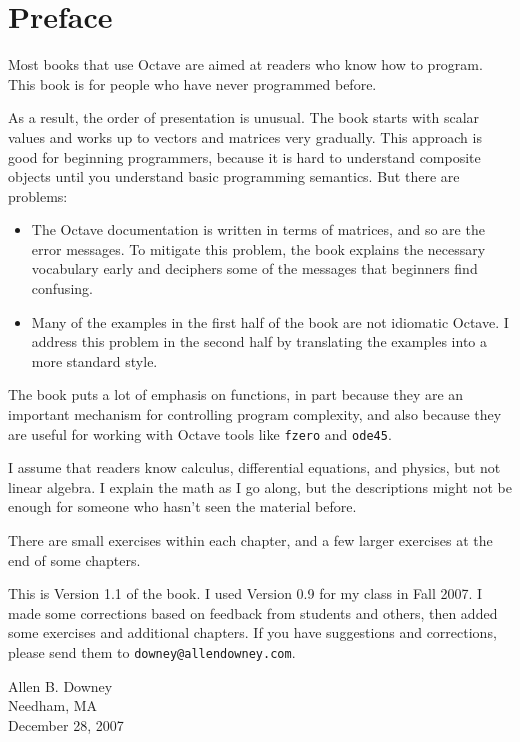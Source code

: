 
\chapter*{Preface}

Most books that use Octave are aimed at readers who know how
to program. This book is for people who have never programmed
before.

As a result, the order of presentation is unusual. The book starts
with scalar values and works up to vectors and matrices very
gradually. This approach is good for beginning programmers, because
it is hard to understand composite objects until you understand basic
programming semantics. But there are problems:

\begin{itemize}

\item The Octave documentation is written in terms of matrices,
and so are the error messages.
To mitigate this problem, the book explains the necessary
vocabulary early and deciphers some of the messages that
beginners find confusing.

\item Many of the examples in the first half of the book are
not idiomatic Octave. I address this problem in the second
half by translating the examples into a more standard style.

\end{itemize}

The book puts a lot of emphasis on functions, in part because they are
an important mechanism for controlling program complexity, and also
because they are useful for working with Octave tools like {\tt fzero}
and {\tt ode45}.

I assume that readers know calculus, differential equations, and
physics, but not linear algebra. I explain the math as I go along,
but the descriptions might not be enough for someone who hasn't seen
the material before.

There are small exercises within each chapter, and a few larger
exercises at the end of some chapters.

This is Version 1.1 of the book. I used Version 0.9 for my class
in Fall 2007. I made some corrections based on feedback from students
and others, then added some exercises and additional chapters.
If you have suggestions and corrections, please send them to
{\tt downey@allendowney.com}.

\noindent Allen B. Downey \\
\noindent Needham, MA \\
\noindent December 28, 2007

